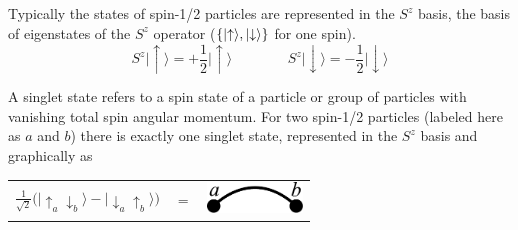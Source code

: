 Typically the states of spin-1/2 particles are represented in the $S^z$ basis, the basis of eigenstates of the $S^z$ operator ($\{\lvert {\uparrow} \rangle,\lvert {\downarrow} \rangle\}$ for one spin).  
\begin{equation}
 	  S^z\lvert \uparrow \rangle = +\frac{1}{2} \lvert \uparrow \rangle
 	 \:\:\:    \:\:\:    \:\:\:    \:\:\:    \:\:\:    \:\:\: 
 	  S^z\lvert \downarrow \rangle = -\frac{1}{2} \lvert \downarrow \rangle
	   \label{SZ}
\end{equation}

A singlet state refers to a spin state of a particle or group of particles with vanishing total spin angular momentum.
For two spin-1/2 particles (labeled here as $a$ and $b$) there is exactly one singlet state, represented in the $S^z$ basis and graphically as

\begin{center}
\begin{tabular}{ccc}
$  \frac{1}{\sqrt{2}}\big( \lvert \uparrow_a \downarrow_b \rangle - \lvert \downarrow_a \uparrow_b \rangle \big) $ & $= $
&
\includegraphics [width=1in]
{./figures/made/bond2.pdf}
\end{tabular}
\end{center}

